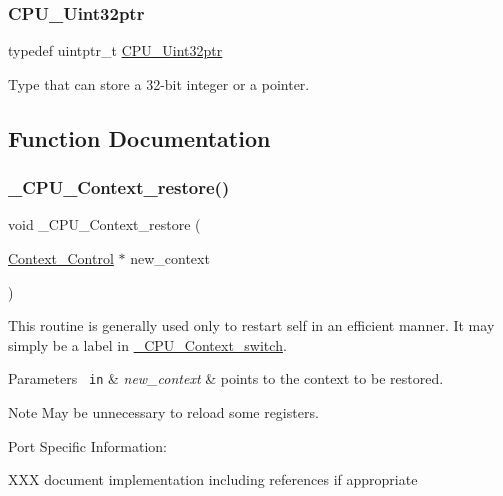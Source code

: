 \subsubsection{\texorpdfstring{CPU\_Uint32ptr}{CPU\_Uint32ptr}}
{\footnotesize\ttfamily typedef uintptr\+\_\+t \mbox{\hyperlink{group__RTEMSScoreCPUARM_ga9fca17f81f850e128fcc8ed5b87ff2ab}{C\+P\+U\+\_\+\+Uint32ptr}}}

Type that can store a 32-\/bit integer or a pointer. 

\subsection{Function Documentation}
\mbox{\label{group__RTEMSScoreCPUMIPS_ga80726ebfe00f31a88b086cc4474c472f}} 
\subsubsection{\texorpdfstring{\_CPU\_Context\_restore()}{\_CPU\_Context\_restore()}}
{\footnotesize\ttfamily void \+\_\+\+C\+P\+U\+\_\+\+Context\+\_\+restore (\begin{DoxyParamCaption}\item[{\mbox{\hyperlink{structContext__Control}{Context\+\_\+\+Control}} $\ast$}]{new\+\_\+context }\end{DoxyParamCaption})}

This routine is generally used only to restart self in an efficient manner. It may simply be a label in \mbox{\hyperlink{group__RTEMSScoreCPUARM_gaa9f8cc989454b28232e5375e30c90970}{\+\_\+\+C\+P\+U\+\_\+\+Context\+\_\+switch}}.


\begin{DoxyParams}[1]{Parameters}
\mbox{\texttt{ in}}  & {\em new\+\_\+context} & points to the context to be restored.\\
\hline
\end{DoxyParams}
\begin{DoxyNote}{Note}
May be unnecessary to reload some registers.
\end{DoxyNote}
Port Specific Information\+:

X\+XX document implementation including references if appropriate \mbox{\label{group__RTEMSScoreCPUMIPS_gaa9f8cc989454b28232e5375e30c90970}} 

